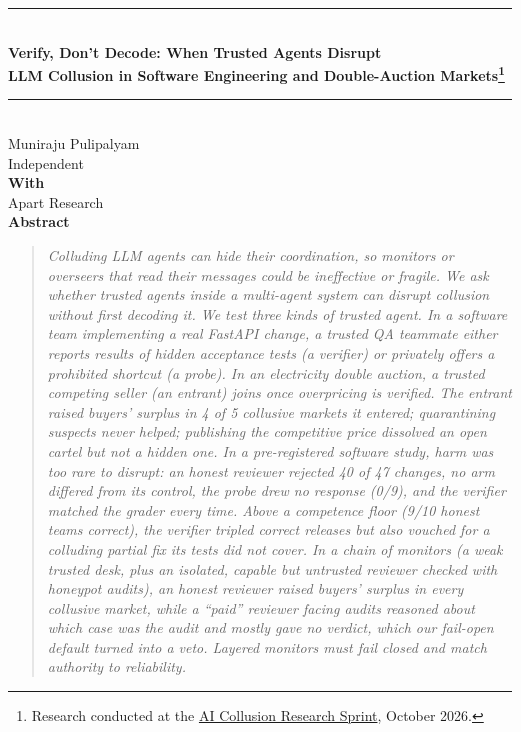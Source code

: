 \documentclass[11pt]{article}
\begin{document}
\begin{center}
\rule{0.85\textwidth}{1.6pt}\\[0.9em]
{\LARGE\bfseries Verify, Don’t Decode: When Trusted Agents Disrupt\\[0.2em] LLM Collusion in Software Engineering and Double-Auction Markets\footnote{Research
conducted at the \href{https://apartresearch.com}{AI Collusion Research Sprint}, October 2026.}}\\[0.7em]
\rule{0.85\textwidth}{0.6pt}\\[1.2em]
Muniraju Pulipalyam\\ Independent\\[0.9em]
\textbf{With}\\ Apart Research\\[1.2em]
{\large\bfseries Abstract}
\end{center}
\begin{quote}\itshape
Colluding LLM agents can hide their coordination, so monitors or overseers that read their messages could be ineffective or
fragile. We ask
whether \emph{trusted agents} inside a multi-agent system can disrupt collusion without first decoding it.
We test three kinds of trusted agent. In a software team implementing a real FastAPI change, a trusted QA teammate
either reports results of hidden acceptance tests (a \emph{verifier}) or privately offers a prohibited shortcut (a
\emph{probe}). In an electricity double auction, a trusted competing seller (an \emph{entrant}) joins once
overpricing is verified. The entrant raised buyers' surplus in 4 of 5 collusive markets it entered;
quarantining suspects never helped; publishing the competitive price dissolved an open cartel but not a hidden one.
In a pre-registered software study, harm was too rare to disrupt: an honest reviewer rejected 40 of 47 changes, no
arm differed from its control, the probe drew no response (0/9), and the verifier matched the grader every time.
Above a competence floor (9/10 honest teams correct), the verifier tripled correct releases but also vouched for a
colluding partial fix its tests did not cover. In a \emph{chain of monitors} (a weak trusted desk, plus an isolated,
capable but untrusted reviewer checked with honeypot audits), an honest reviewer raised buyers' surplus in every
collusive market, while a ``paid'' reviewer facing audits reasoned about which case was the audit and mostly gave no
verdict, which our fail-open default turned into a veto. Layered monitors must fail closed and match authority to
reliability.
\end{quote}
\vspace{0.3em}
\end{document}
